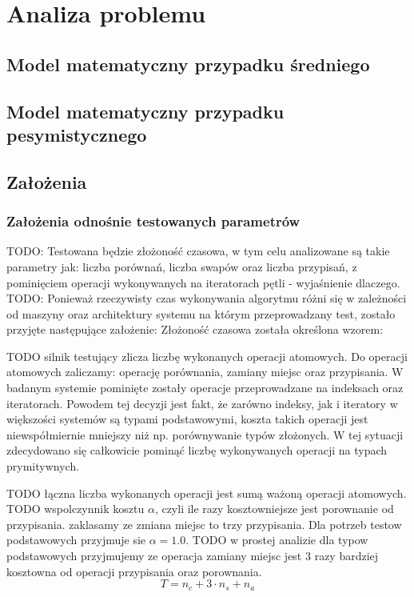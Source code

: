 \chapter{Analiza problemu}

\section{Model matematyczny przypadku średniego}

\section{Model matematyczny przypadku pesymistycznego}

\section{Założenia}

\subsection{Założenia odnośnie testowanych parametrów}
TODO: Testowana będzie złożoność czasowa, w tym celu analizowane są takie parametry jak: liczba porównań,
liczba swapów oraz liczba przypisań, z pominięciem operacji wykonywanych na iteratorach pętli -
wyjaśnienie dlaczego.\\

TODO: Ponieważ rzeczywisty czas wykonywania algorytmu różni się w zależności od maszyny oraz architektury systemu
na którym przeprowadzany test, zostało przyjęte następujące założenie:
Złożoność czasowa została określona wzorem:

TODO silnik testujący zlicza liczbę wykonanych operacji atomowych. Do operacji atomowych zaliczamy: operację porównania, zamiany miejsc oraz przypisania. W badanym systemie pominięte zostały operacje przeprowadzane na indeksach oraz iteratorach. Powodem tej decyzji jest fakt, że zarówno indeksy, jak i iteratory w większości systemów są typami podstawowymi, koszta takich operacji jest niewspółmiernie mniejszy niż np. porównywanie typów złożonych. W tej sytuacji zdecydowano się całkowicie pominąć liczbę wykonywanych operacji na typach prymitywnych.

TODO łączna liczba wykonanych operacji jest sumą ważoną operacji atomowych.
TODO wspolczynnik kosztu \boldmath$\alpha$, czyli ile razy kosztowniejsze jest porownanie od przypisania. zaklasamy ze zmiana miejsc to trzy przypisania. Dla potrzeb testow podstawowych przyjmuje sie \boldmath$\alpha = 1.0$.
TODO w prostej analizie dla typow podstawowych przyjmujemy ze operacja zamiany miejsc jest 3 razy bardziej kosztowna od operacji przypisania oraz porownania.
\boldmath$$T = n_c + 3 \cdot n_s + n_a $$

